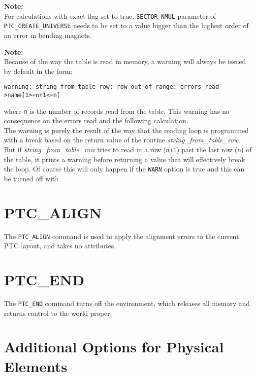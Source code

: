\textbf{Note:}\\
  For calculations with exact flag set to true,
  \texttt{SECTOR\_NMUL} parameter of \texttt{PTC\_CREATE\_UNIVERSE}
  needs to be set to a value bigger than the highest order of an error in bending magnets.

\textbf{Note:}\\
Because of the way the table is read in memory, a warning will always be
issued by default in the form:
{\small
\begin{verbatim}
warning: string_from_table_row: row out of range: errors_read->name[1>=n+1<=n]
\end{verbatim}
}
where \texttt{n} is  the number of records read from the table.
This warning has no consequence on the errors read and the following
calculation. \\
The warning is purely the result of the way that the reading loop is
programmed with a break based on the return value of the routine
\textsl{string\_from\_table\_row}.
But if \textsl{string\_from\_table\_row} tries to read in a row (\texttt{n+1})
past the last row (\texttt{n}) of the table, it prints a warning before
returning a value that will effectively break the loop. Of course this
will only happen if the \texttt{WARN} option is true and this can be turned
off with 



\section{PTC\_ALIGN}
\label{sec:ptc-align}

The \texttt{PTC\_ALIGN} command is used to apply the \madx alignment
errors to the current PTC layout, and takes no attributes.



\section{PTC\_END}
\label{sec:ptc-end}

The \texttt{PTC\_END} command turns off the \ptc environment,
which releases all memory and returns control to the \madx world proper.



\section{Additional Options for Physical Elements}
\label{sec:add-option-PTC}


